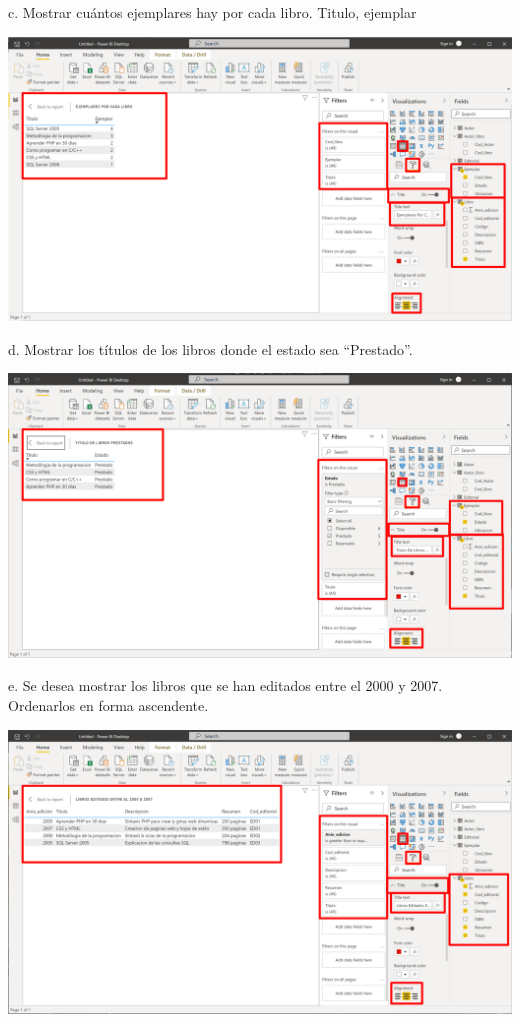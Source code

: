 \documentclass[12pt,letterpaper]{article}
\begin{document}
c. Mostrar cuántos ejemplares hay por cada libro. Titulo, ejemplar
\begin{center}
    \includegraphics[width=16cm]{img/28.png}  
    \vspace{1cm}
\end{center}
d. Mostrar los títulos de los libros donde el estado sea “Prestado”.
\begin{center}
    \includegraphics[width=16cm]{img/30.png}
    \vspace{3cm}  
\end{center}
e. Se desea mostrar los libros que se han editados entre el 2000 y 2007. Ordenarlos en
forma ascendente.
\begin{center}
    \includegraphics[width=16cm]{img/25.png}
    \vspace{1cm}  
\end{center}
\end{document}
